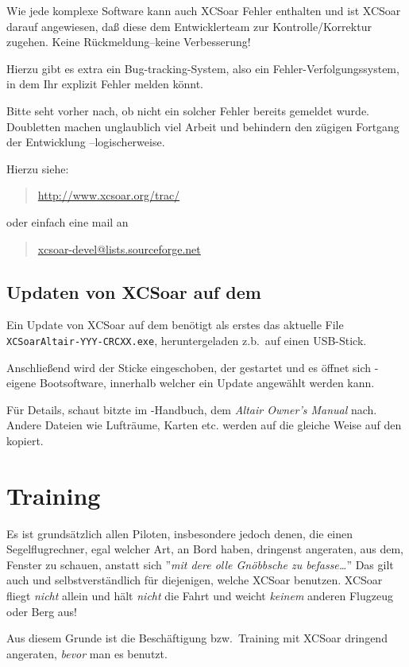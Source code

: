 Wie jede komplexe Software kann auch \textsf{XCSoar} Fehler enthalten und ist \textsf{XCSoar} darauf angewiesen, daß diese dem Entwicklerteam zur  Kontrolle/Korrektur zugehen. Keine Rückmeldung--keine Verbesserung!

Hierzu gibt es extra ein Bug-tracking-System, also ein Fehler-Verfolgungssystem, in dem Ihr explizit Fehler melden könnt.

Bitte seht vorher nach, ob nicht ein solcher Fehler bereits gemeldet wurde. 
Doubletten machen unglaublich viel Arbeit und behindern den zügigen Fortgang der Entwicklung --logischerweise.  


Hierzu siehe:  
\begin{quote}
\url{http://www.xcsoar.org/trac/}
\end{quote}
oder einfach eine mail an 
\begin{quote}
\url{xcsoar-devel@lists.sourceforge.net}
\end{quote} 

\subsection*{Updaten von \textsf{XCSoar} auf dem \al}

Ein Update von \textsf{XCSoar} auf dem \al  benötigt als erstes das aktuelle  File {\tt XCSoarAltair-YYY-CRCXX.exe}, 
heruntergeladen z.b.\ auf einen USB-Stick. 

Anschließend wird der Sticke eingeschoben, der \al gestartet und es öffnet sich \al-eigene Bootsoftware, 
innerhalb welcher ein Update angewählt werden kann.

Für Details, schaut bitzte im \al-Handbuch, dem {\em Altair Owner's Manual} nach.
Andere Dateien wie Lufträume, Karten etc. werden auf die gleiche Weise auf den \al kopiert. 

\section{Training}
Es ist grundsätzlich allen Piloten,  insbesondere jedoch denen, die einen Segelflugrechner,  egal welcher Art, an Bord haben, 
dringenst angeraten, aus dem, Fenster zu schauen, anstatt sich ''{\it mit dere olle Gnöbbsche zu befasse\dots}''
\achtung 
Das gilt auch und selbstverständlich für diejenigen, welche \textsf{XCSoar} benutzen. \textsf{XCSoar} fliegt {\sl nicht} allein und hält {\sl nicht} 
die Fahrt und weicht {\sl keinem}  anderen Flugzeug oder Berg aus! 

Aus diesem Grunde ist die Beschäftigung bzw.\ Training mit \textsf{XCSoar} dringend angeraten, {\sl bevor} man es benutzt. 


